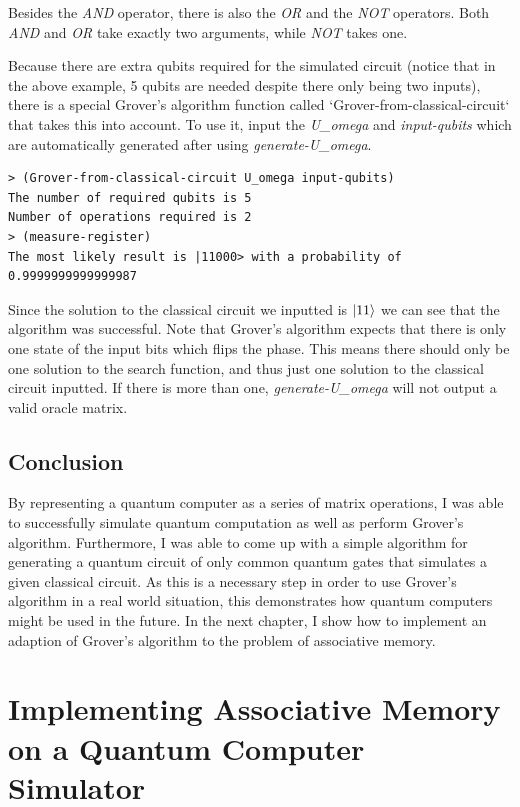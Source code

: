 \documentclass[11pt]{report}
\newcommand{\?}{\stackrel{?}{=}}
\begin{document}
Besides the \textit{AND} operator, there is also the \textit{OR} and the \textit{NOT} operators. Both \textit{AND} and \textit{OR} take exactly two arguments, while \textit{NOT} takes one.

Because there are extra qubits required for the simulated circuit (notice that in the above example, 5 qubits are needed despite there only being two inputs), there is a special Grover's algorithm function called `Grover-from-classical-circuit` that takes this into account. To use it, input the \textit{U\_omega} and \textit{input-qubits} which are automatically generated after using \textit{generate-U\_omega}.

\begin{verbatim}
> (Grover-from-classical-circuit U_omega input-qubits)
The number of required qubits is 5
Number of operations required is 2
> (measure-register)
The most likely result is |11000> with a probability of 0.9999999999999987
\end{verbatim}

Since the solution to the classical circuit we inputted is $\Ket{11}$ we can see that the algorithm was successful. Note that Grover's algorithm expects that there is only one state of the input bits which flips the phase. This means there should only be one solution to the search function, and thus just one solution to the classical circuit inputted. If there is more than one, \textit{generate-U\_omega} will not output a valid oracle matrix.

\section{Conclusion}

By representing a quantum computer as a series of matrix operations, I was able to successfully simulate quantum computation as well as perform Grover's algorithm. Furthermore, I was able to come up with a simple algorithm for generating a quantum circuit of only common quantum gates that simulates a given classical circuit. As this is a necessary step in order to use Grover's algorithm in a real world situation, this demonstrates how quantum computers might be used in the future. In the next chapter, I show how to implement an adaption of Grover's algorithm to the problem of associative memory.


\chapter{Implementing Associative Memory on a Quantum Computer Simulator}
\end{document}
